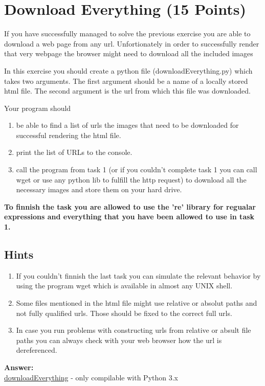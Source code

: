 \documentclass{WeSTassignment}
\begin{document}
\section{Download Everything (15 Points)}

If you have successfully managed to solve the previous exercise you are able to download a web page from any url. Unfortionately in order to successfully render that very webpage the browser might need to download all the included images

In this exercise you should create a python file (downloadEverything.py) which takes two arguments. The first argument should be a name of a locally stored html file. The second argument is the url from which this file was downloaded.

Your program should 
\begin{enumerate}
\item be able to find a list of urls the images that need to be downloaded for successful rendering the html file.
\item print the list of URLs to the console.
\item call the program from task 1 (or if you couldn't complete task 1 you can call wget or use any python lib to fulfill the http request) to download all the necessary images and store them on your hard drive.
\end{enumerate}

\textbf{To finnish the task you are allowed to use the 're' library for regualar expressions and everything that you have been allowed to use in task 1.}

\subsection{Hints}
\begin{enumerate}
\item If you couldn't finnish the last task you can simulate the relevant behavior by using the program wget which is available in almost any UNIX shell. 
\item Some files mentioned in the html file might use relative or absolut paths and not fully qualified urls. Those should be fixed to the correct full urls. 
\item In case you run problems with constructing urls from relative or absult file paths you can always check with your web browser how the url is dereferenced.
\end{enumerate}

\textbf{Answer:} \\
\underline{downloadEverything} - only compilable with Python 3.x\\










\makefooter
\end{document}
